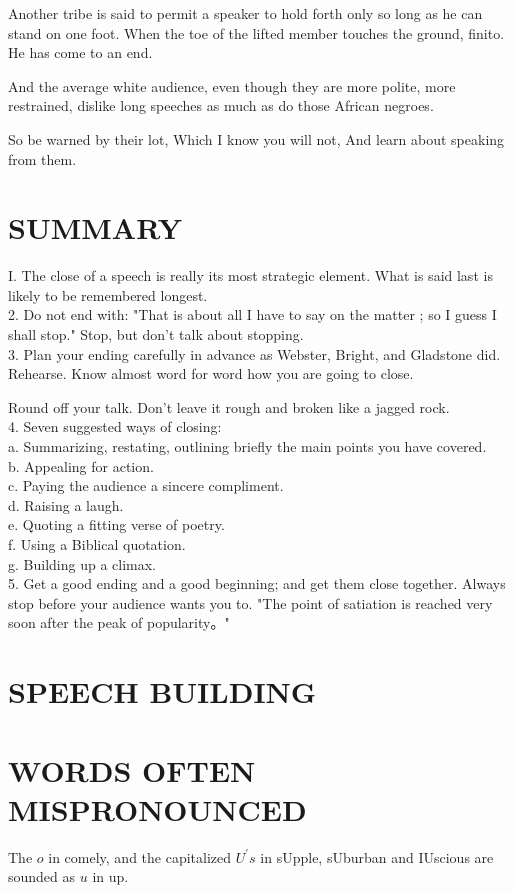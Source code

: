 \documentclass[10pt]{article}
\begin{document}
Another tribe is said to permit a speaker to hold forth only so long as he can stand on one foot. When the toe of the lifted member touches the ground, finito. He has come to an end.

And the average white audience, even though they are more polite, more restrained, dislike long speeches as much as do those African negroes.

\begin{displayquote}
So be warned by their lot, Which I know you will not, And learn about speaking from them.
\end{displayquote}

\section*{SUMMARY}
I. The close of a speech is really its most strategic element. What is said last is likely to be remembered longest.\\
2. Do not end with: "That is about all I have to say on the matter ; so I guess I shall stop." Stop, but don't talk about stopping.\\
3. Plan your ending carefully in advance as Webster, Bright, and Gladstone did. Rehearse. Know almost word for word how you are going to close.

Round off your talk. Don't leave it rough and broken like a jagged rock.\\
4. Seven suggested ways of closing:\\
a. Summarizing, restating, outlining briefly the main points you have covered.\\
b. Appealing for action.\\
c. Paying the audience a sincere compliment.\\
d. Raising a laugh.\\
e. Quoting a fitting verse of poetry.\\
f. Using a Biblical quotation.\\
g. Building up a climax.\\
5. Get a good ending and a good beginning; and get them close together. Always stop before your audience wants you to. "The point of satiation is reached very soon after the peak of popularity。"

\section*{SPEECH BUILDING}
\section*{WORDS OFTEN MISPRONOUNCED}
The $o$ in comely, and the capitalized $U^{\prime} s$ in sUpple, sUburban and IUscious are sounded as $u$ in up.
\end{document}
